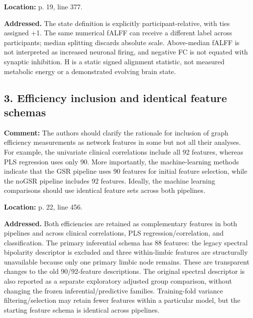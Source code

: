 \documentclass[11pt]{article}
\begin{document}
\textbf{Location:} p. 19, line 377.


 \textbf{Addressed.} The state definition is explicitly participant-relative, with ties assigned +1. The same numerical fALFF can receive a different label across participants; median splitting discards absolute scale. Above-median fALFF is not interpreted as increased neuronal firing, and negative FC is not equated with synaptic inhibition. H is a static signed alignment statistic, not measured metabolic energy or a demonstrated evolving brain state.


\subsection*{3. Efficiency inclusion and identical feature schemas}

\textbf{Comment:} The authors should clarify the rationale for inclusion of graph efficiency measurements as network features in some but not all their analyses. For example, the univariate clinical correlations include all 92 features, whereas PLS regression uses only 90. More importantly, the machine-learning methods indicate that the GSR pipeline uses 90 features for initial feature selection, while the noGSR pipeline includes 92 features. Ideally, the machine learning comparisons should use identical feature sets across both pipelines.


\textbf{Location:} p. 22, line 456.


 \textbf{Addressed.} Both efficiencies are retained as complementary features in both pipelines and across clinical correlations, PLS regression/correlation, and classification. The primary inferential schema has 88 features: the legacy spectral bipolarity descriptor is excluded and three within-limbic features are structurally unavailable because only one primary limbic node remains. These are transparent changes to the old 90/92-feature descriptions. The original spectral descriptor is also reported as a separate exploratory adjusted group comparison, without changing the frozen inferential/predictive families. Training-fold variance filtering/selection may retain fewer features within a particular model, but the starting feature schema is identical across pipelines.
\end{document}
